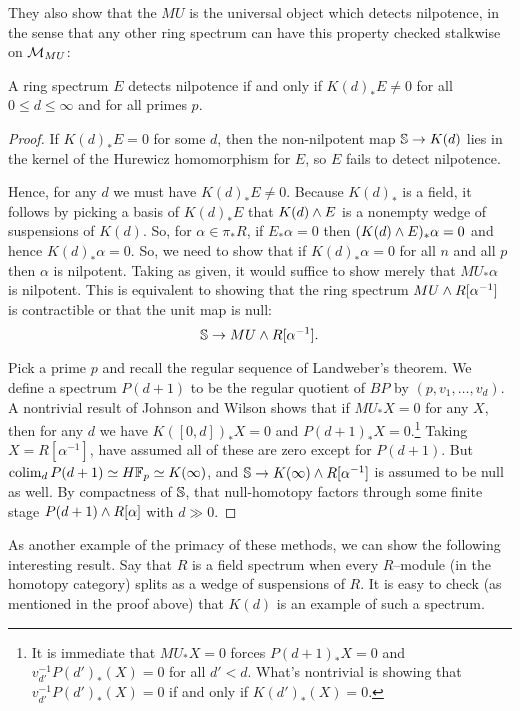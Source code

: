 They also show that the $MU$ is the universal object which detects nilpotence, in the sense that any other ring spectrum can have this property checked stalkwise on $\context{MU}$:

\begin{corollary}
A ring spectrum $E$ detects nilpotence if and only if $K(d)_* E \ne 0$ for all $0 \le d \le \infty$ and for all primes $p$.
\end{corollary}
\begin{proof}
If $K(d)_* E = 0$ for some $d$, then the non-nilpotent map $\S \to K(d)$ lies in the kernel of the Hurewicz homomorphism for $E$, so $E$ fails to detect nilpotence.

Hence, for any $d$ we must have $K(d)_* E \ne 0$.  Because $K(d)_*$ is a field, it follows by picking a basis of $K(d)_* E$ that $K(d) \sm E$ is a nonempty wedge of suspensions of $K(d)$.  So, for $\alpha \in \pi_* R$, if $E_* \alpha = 0$ then $(K(d) \sm E)_* \alpha = 0$ and hence $K(d)_* \alpha = 0$.  So, we need to show that if $K(d)_* \alpha = 0$ for all $n$ and all $p$ then $\alpha$ is nilpotent.  Taking  as given, it would suffice to show merely that $MU_* \alpha$ is nilpotent.  This is equivalent to showing that the ring spectrum $MU \sm R[\alpha^{-1}]$ is contractible or that the unit map is null: \[\S \to MU \sm R[\alpha^{-1}].\]

Pick a prime $p$ and recall the regular sequence of Landweber's theorem.  We define a spectrum $P(d+1)$ to be the regular quotient of $BP$ by $(p, v_1, \ldots, v_d)$.  A nontrivial result of Johnson and Wilson shows that if $MU_* X = 0$ for any $X$, then for any $d$ we have $K([0, d])_* X = 0$ and $P(d+1)_* X = 0$.\footnote{It is immediate that $MU_* X = 0$ forces $P(d+1)_* X = 0$ and $v_{d'}^{-1} P(d')_*(X) = 0$ for all $d' < d$.  What's nontrivial is showing that $v_{d'}^{-1} P(d')_*(X) = 0$ if and only if $K(d')_*(X) = 0$.}  Taking $X = R[\alpha^{-1}]$, have assumed all of these are zero except for $P(d+1)$.  But $\colim_d P(d+1) \simeq H\F_p \simeq K(\infty)$, and $\S \to K(\infty) \sm R[\alpha^{-1}]$ is assumed to be null as well.  By compactness of $\S$, that null-homotopy factors through some finite stage $P(d+1) \sm R[\alpha]$ with $d \gg 0$.
\end{proof}

As another example of the primacy of these methods, we can show the following interesting result.  Say that $R$ is a field spectrum when every $R$--module (in the homotopy category) splits as a wedge of suspensions of $R$.  It is easy to check (as mentioned in the proof above) that $K(d)$ is an example of such a spectrum.

